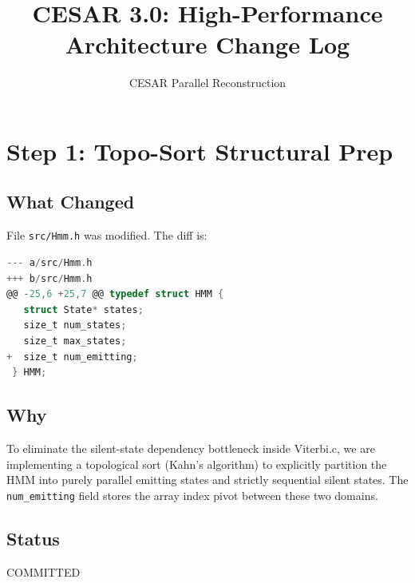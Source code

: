 \documentclass[11pt,a4paper]{article}
\begin{document}
\title{CESAR 3.0: High-Performance Architecture Change Log}
\author{CESAR Parallel Reconstruction}
\maketitle

\section{Step 1: Topo-Sort Structural Prep}
\subsection{What Changed}
File \texttt{src/Hmm.h} was modified. The diff is:
\begin{lstlisting}[language=C]
--- a/src/Hmm.h
+++ b/src/Hmm.h
@@ -25,6 +25,7 @@ typedef struct HMM {
   struct State* states;
   size_t num_states;
   size_t max_states;
+  size_t num_emitting;
 } HMM;
\end{lstlisting}

\subsection{Why}
To eliminate the silent-state dependency bottleneck inside Viterbi.c, we are implementing a topological sort (Kahn's algorithm) to explicitly partition the HMM into purely parallel emitting states and strictly sequential silent states. The \texttt{num_emitting} field stores the array index pivot between these two domains.

\subsection{Status}
COMMITTED
\end{document}
